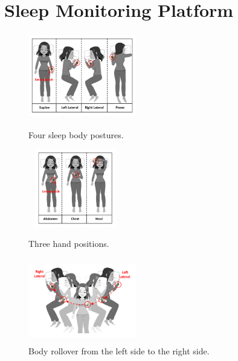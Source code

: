 \section{\systemname Sleep Monitoring Platform}\label{Sec:3design}





\begin{figure}
	\centering
	\begin{minipage}[t]{.33\textwidth}
		\centering
		  \includegraphics[width=4.7cm,height=3.7cm]{Figures/BodyPosture.pdf}
		\caption{Four sleep body postures.}
		\label{fig:BodyPosture}
	\end{minipage}%
	\begin{minipage}[t]{.33\textwidth}
		\centering
		\includegraphics[width=4.1cm,height=3.4cm]{Figures/HandPosition.pdf}
		\caption{Three hand positions.}
		\label{fig:HandPosition}		
	\end{minipage}
\begin{minipage}[t]{.33\textwidth}
		\centering
	\includegraphics[width=4.7cm,height=3.7cm]{Figures/BodyRollover.pdf}
	\caption{Body rollover from the left side to the right side.}
	\label{fig:BodyRollover}
\end{minipage}
\end{figure}


